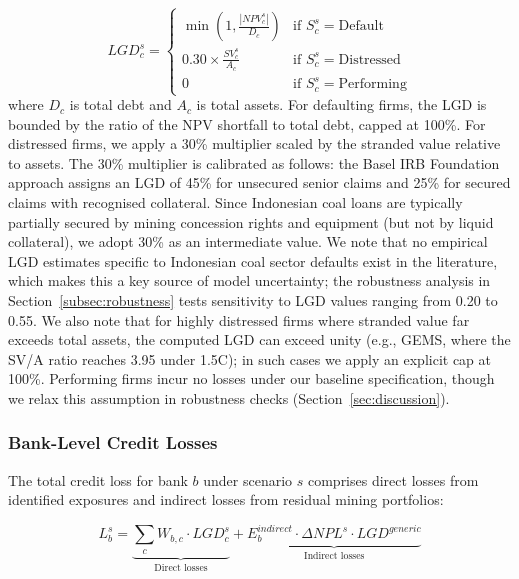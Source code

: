 \begin{equation}
\label{eq:lgd}
LGD_c^s = \begin{cases}
\min\left(1, \frac{|NPV_c^s|}{D_c}\right) & \text{if } S_c^s = \text{Default} \\[6pt]
0.30 \times \frac{SV_c^s}{A_c} & \text{if } S_c^s = \text{Distressed} \\[6pt]
0 & \text{if } S_c^s = \text{Performing}
\end{cases}
\end{equation}
where $D_c$ is total debt and $A_c$ is total assets. For defaulting firms, the LGD is bounded by the ratio of the NPV shortfall to total debt, capped at 100\%. For distressed firms, we apply a 30\% multiplier scaled by the stranded value relative to assets. The 30\% multiplier is calibrated as follows: the Basel IRB Foundation approach assigns an LGD of 45\% for unsecured senior claims and 25\% for secured claims with recognised collateral. Since Indonesian coal loans are typically partially secured by mining concession rights and equipment (but not by liquid collateral), we adopt 30\% as an intermediate value. We note that no empirical LGD estimates specific to Indonesian coal sector defaults exist in the literature, which makes this a key source of model uncertainty; the robustness analysis in Section~\ref{subsec:robustness} tests sensitivity to LGD values ranging from 0.20 to 0.55. We also note that for highly distressed firms where stranded value far exceeds total assets, the computed LGD can exceed unity (e.g., GEMS, where the SV/A ratio reaches 3.95 under 1.5\textdegree C); in such cases we apply an explicit cap at 100\%. Performing firms incur no losses under our baseline specification, though we relax this assumption in robustness checks (Section~\ref{sec:discussion}).

\subsubsection{Bank-Level Credit Losses}

The total credit loss for bank $b$ under scenario $s$ comprises direct losses from identified exposures and indirect losses from residual mining portfolios:

\begin{equation}
\label{eq:bank_loss}
L_b^s = \underbrace{\sum_{c} W_{b,c} \cdot LGD_c^s}_{\text{Direct losses}} + \underbrace{E_b^{indirect} \cdot \Delta NPL^s \cdot LGD^{generic}}_{\text{Indirect losses}}
\end{equation}

